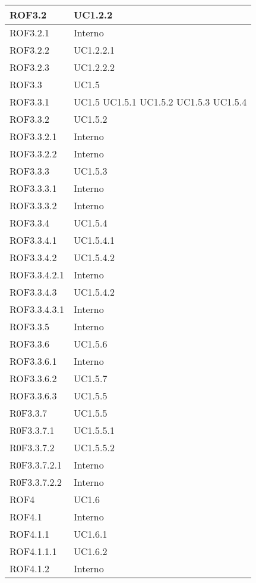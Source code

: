 \begin{center}
\begin{longtable}{| p{4cm} | p{4cm} |}
ROF3.2   &  UC1.2.2 \\
\hline
ROF3.2.1   &  Interno \\
\hline
ROF3.2.2   &  UC1.2.2.1 \\
\hline
ROF3.2.3   &  UC1.2.2.2 \\
\hline
ROF3.3   &  UC1.5 \\
\hline
ROF3.3.1   &  UC1.5 \newline UC1.5.1 \newline UC1.5.2 \newline UC1.5.3 \newline UC1.5.4 \\
\hline
ROF3.3.2   &  UC1.5.2 \\
\hline
ROF3.3.2.1   &  Interno \\
\hline
ROF3.3.2.2   &  Interno \\
\hline
ROF3.3.3   &  UC1.5.3 \\
\hline
ROF3.3.3.1   &  Interno \\
\hline
ROF3.3.3.2   &  Interno \\
\hline
ROF3.3.4   &  UC1.5.4 \\
\hline
ROF3.3.4.1   &  UC1.5.4.1 \\
\hline
ROF3.3.4.2   &  UC1.5.4.2 \\
\hline
ROF3.3.4.2.1   &  Interno \\
\hline
ROF3.3.4.3   &  UC1.5.4.2 \\
\hline
ROF3.3.4.3.1   &  Interno \\
\hline
ROF3.3.5   &  Interno \\
\hline
ROF3.3.6   &  UC1.5.6 \\
\hline
ROF3.3.6.1   &  Interno \\
\hline
ROF3.3.6.2   &  UC1.5.7 \\
\hline
ROF3.3.6.3   &  UC1.5.5 \\
\hline
R0F3.3.7   &  UC1.5.5 \\
\hline
R0F3.3.7.1   &  UC1.5.5.1 \\
\hline
R0F3.3.7.2   &  UC1.5.5.2 \\
\hline
R0F3.3.7.2.1   &  Interno \\
\hline
R0F3.3.7.2.2   &  Interno \\
\hline
ROF4   &  UC1.6 \\
\hline
ROF4.1   &  Interno \\
\hline
ROF4.1.1   &  UC1.6.1 \\
\hline
ROF4.1.1.1   &  UC1.6.2 \\
\hline
ROF4.1.2   &  Interno \\

\end{longtable}
\end{center}
